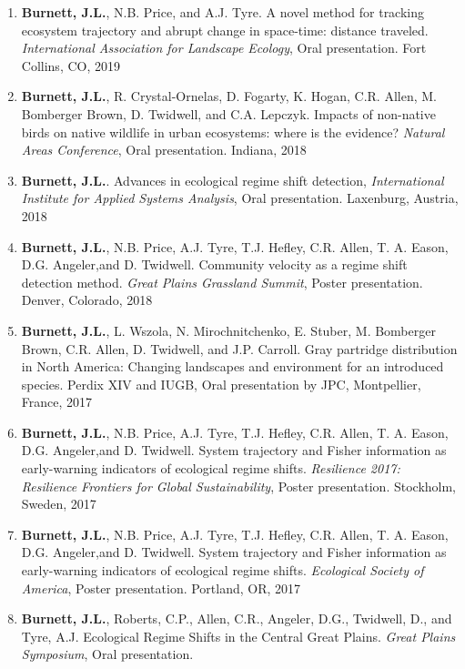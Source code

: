 \documentclass[11pt,]{article}
\begin{document}
\begin{enumerate}
\def\labelenumi{\arabic{enumi}.}
\item
  \textbf{Burnett, J.L.}, N.B. Price, and A.J. Tyre. A novel method for
  tracking ecosystem trajectory and abrupt change in space-time:
  distance traveled. \emph{International Association for Landscape
  Ecology}, Oral presentation. Fort Collins, CO, 2019
\item
  \textbf{Burnett, J.L.}, R. Crystal-Ornelas, D. Fogarty, K. Hogan, C.R.
  Allen, M. Bomberger Brown, D. Twidwell, and C.A. Lepczyk. Impacts of
  non-native birds on native wildlife in urban ecosystems: where is the
  evidence? \emph{Natural Areas Conference}, Oral presentation. Indiana,
  2018
\item
  \textbf{Burnett, J.L.}. Advances in ecological regime shift detection,
  \emph{International Institute for Applied Systems Analysis}, Oral
  presentation. Laxenburg, Austria, 2018
\item
  \textbf{Burnett, J.L.}, N.B. Price, A.J. Tyre, T.J. Hefley, C.R.
  Allen, T. A. Eason, D.G. Angeler,and D. Twidwell. Community velocity
  as a regime shift detection method. \emph{Great Plains Grassland
  Summit}, Poster presentation. Denver, Colorado, 2018
\item
  \textbf{Burnett, J.L.}, L. Wszola, N. Mirochnitchenko, E. Stuber, M.
  Bomberger Brown, C.R. Allen, D. Twidwell, and J.P. Carroll. Gray
  partridge distribution in North America: Changing landscapes and
  environment for an introduced species. Perdix XIV and IUGB, Oral
  presentation by JPC, Montpellier, France, 2017
\item
  \textbf{Burnett, J.L.}, N.B. Price, A.J. Tyre, T.J. Hefley, C.R.
  Allen, T. A. Eason, D.G. Angeler,and D. Twidwell. System trajectory
  and Fisher information as early-warning indicators of ecological
  regime shifts. \emph{Resilience 2017: Resilience Frontiers for Global
  Sustainability}, Poster presentation. Stockholm, Sweden, 2017
\item
  \textbf{Burnett, J.L.}, N.B. Price, A.J. Tyre, T.J. Hefley, C.R.
  Allen, T. A. Eason, D.G. Angeler,and D. Twidwell. System trajectory
  and Fisher information as early-warning indicators of ecological
  regime shifts. \emph{Ecological Society of America}, Poster
  presentation. Portland, OR, 2017
\item
  \textbf{Burnett, J.L.}, Roberts, C.P., Allen, C.R., Angeler, D.G.,
  Twidwell, D., and Tyre, A.J. Ecological Regime Shifts in the Central
  Great Plains. \emph{Great Plains Symposium}, Oral presentation.

\end{enumerate}
\end{document}
